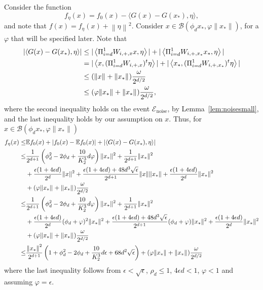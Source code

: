 \documentclass[11pt]{article}
\newcommand{\xo}{x_\ast}
\newcommand{\PiWd}{\Pi_{i=d}^1 W_{i,+,x}}
\newcommand{\PiWdo}{\Pi_{i=d}^1 W_{i,+,\xo}}
\newcommand{\feta}{f_\eta}
\newcommand{\fzero}{f_0}
\newcommand{\Tnorm}{}
\newcommand\norm[2][\Tnorm]{\ensuremath{{\left\|#2\right\|}_{#1}}}
\newcommand\Tinnerprod{}
\newcommand{\innerprod}[3][\Tinnerprod]{\ifthenelse{\equal{#1}{}}{\ensuremath{\left<#2,#3\right>}}{\ensuremath{\left<#2,#3\right>_{#1}}}}
\newcommand\eventnoisesmall{\mathcal E_{\text{noise}}}
\begin{document}
Consider the function
\[
\feta(x) = \fzero(x) - \langle G(x) - G(\xo), \eta \rangle,
\]
and note that $f(x) = \feta(x) + \norm{\eta}^2$.
Consider $x \in \mathcal{B}(\phi_d x_*, \varphi  \|x_*\|)$, for a $\varphi$ that will be specified later.
Note that
\begin{align*}
\left|\innerprod{G(x) - G(x_\ast)}{\eta}\right|
&\leq
|\innerprod{\PiWd x}{\eta}|
+
|\innerprod{\PiWdo \xo}{\eta}| \\
&=
|\innerprod{x}{(\PiWd)^t\eta}|
+
|\innerprod{\xo}{(\PiWdo)^t\eta}| \\
&\leq (\norm{x} + \norm{\xo}) \frac{\omega}{2^{d/2}}\\
&\leq (\varphi \norm{\xo} + \norm{\xo}) \frac{\omega}{2^{d/2}},
\end{align*}
where the second inequality holds on the event $\eventnoisesmall$, by Lemma~\ref{lem:noisesmall}, and the last inequality holds by our assumption on $x$.
Thus, for $x \in \mathcal{B}(\phi_d x_*, \varphi  \|x_*\|)$
\begin{align}
\feta(x)
\leq&
\mathbb{E}\fzero(x) + |\fzero(x) - \mathbb{E}\fzero(x)| +
\left|\innerprod{G(x) - G(x_\ast)}{\eta}\right|
\nonumber \\
%
\leq&
\frac{1}{2^{d+1}} \left( \phi_d^2 - 2 \phi_d + \frac{10}{K_2^3} d \varphi \right) \|x_*\|^2 + \frac{1}{2^{d+1}} \|x_*\|^2 \nonumber \\
&+
\frac{\epsilon (1 + 4 \epsilon d)}{2^d} \|x\|^2 + \frac{\epsilon(1 + 4 \epsilon d) + 48 d^3 \sqrt{\epsilon}}{2^{d+1}} \|x\| \|x_*\| + \frac{\epsilon (1 + 4 \epsilon d)}{2^d} \|x_*\|^2 \nonumber \\
&+ (\varphi \norm{\xo} + \norm{\xo}) \frac{\omega}{2^{d/2}} \nonumber \\
%
\leq&
\frac{1}{2^{d+1}} \left( \phi_d^2 - 2 \phi_d + \frac{10}{K_2^3} d \varphi \right) \|x_*\|^2 + \frac{1}{2^{d+1}} \|x_*\|^2 \nonumber \\
&+
\frac{\epsilon (1 + 4 \epsilon d)}{2^d} (\phi_d + \varphi)^2 \|x_*\|^2 + \frac{\epsilon(1 + 4 \epsilon d) + 48 d^3 \sqrt{\epsilon}}{2^{d+1}} (\phi_d + \varphi)\|x_*\|^2 + \frac{\epsilon (1 + 4 \epsilon d)}{2^d} \|x_*\|^2  \nonumber \\
&+
(\varphi \norm{\xo} + \norm{\xo}) \frac{\omega}{2^{d/2}} \nonumber \\%
%
\leq&
\frac{ \norm{x_*}^2 }{2^{d+1}}
\left(
1+
\phi_d^2 - 2 \phi_d + \frac{10}{K_2^3} d \epsilon
+
68 d^2 \sqrt{\epsilon}
\right)
+
(\varphi \norm{\xo} + \norm{\xo}) \frac{\omega}{2^{d/2}} \label{GA:e42}
\end{align}
where the last inequality follows from $\epsilon < \sqrt{\epsilon}$, $\rho_d \leq 1$, $4 \epsilon d < 1$, $\varphi < 1$ and assuming $\varphi = \epsilon$.
\end{document}

